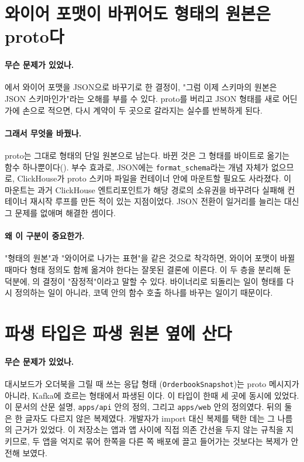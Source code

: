 \section{와이어 포맷이 바뀌어도 형태의 원본은 proto다}
\label{sec:contract-shape-vs-wire}

\paragraph{무슨 문제가 있었나.} 에서 와이어 포맷을 JSON으로
바꾸기로 한 결정이, "그럼 이제 스키마의 원본은 JSON 스키마인가"라는 오해를 부를 수
있다. proto를 버리고 JSON 형태를 새로 어딘가에 손으로 적으면, 다시 계약이 두
곳으로 갈라지는 실수를 반복하게 된다.

\paragraph{그래서 무엇을 바꿨나.} proto는 그대로 형태의 단일 원본으로 남는다. 바뀐
것은 그 형태를 바이트로 옮기는 함수 하나뿐이다(). 부수
효과로, JSON에는 \texttt{format\_schema}라는 개념 자체가 없으므로, ClickHouse가
proto 스키마 파일을 컨테이너 안에 마운트할 필요도 사라졌다. 이 마운트는 과거
ClickHouse 엔트리포인트가 해당 경로의 소유권을 바꾸려다 실패해 컨테이너 재시작
루프를 만든 적이 있는 지점이었다. JSON 전환이 일거리를 늘리는 대신 그 문제를
없애며 해결한 셈이다.

\paragraph{왜 이 구분이 중요한가.} "형태의 원본"과 "와이어로 나가는 표현"을 같은
것으로 착각하면, 와이어 포맷이 바뀔 때마다 형태 정의도 함께 옮겨야 한다는 잘못된
결론에 이른다. 이 두 층을 분리해 둔 덕분에, 의 결정이
"잠정적"이라고 말할 수 있다. 바이너리로 되돌리는 일이 형태를 다시 정의하는 일이
아니라, 코덱 안의 함수 호출 하나를 바꾸는 일이기 때문이다.

\section{파생 타입은 파생 원본 옆에 산다}
\label{sec:contract-view}

\paragraph{무슨 문제가 있었나.} 대시보드가 오더북을 그릴 때 쓰는 응답 형태
(\texttt{OrderbookSnapshot})는 proto 메시지가 아니라, Kafka에 흐르는 형태에서
파생된 이다. 이 타입이 한때 세 곳에 동시에 있었다. 이 문서의
산문 설명, \texttt{apps/api} 안의 정의, 그리고 \texttt{apps/web} 안의 정의였다.
뒤의 둘은 한 글자도 다르지 않은 복제였다. 개발자가 import 대신 복제를 택한 데는
그 나름의 근거가 있었다. 이 저장소는 앱과 앱 사이에 직접 의존 간선을 두지 않는
규칙을 지키므로, 두 앱을 억지로 묶어 한쪽을 다른 쪽 배포에 끌고 들어가는 것보다는
복제가 안전해 보였다.

